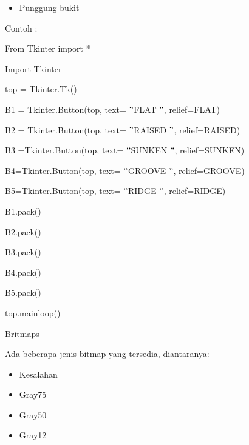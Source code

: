 \documentclass[a4paper,12pt]{report}
\begin{document}
\begin{myEnumerate}
\begin{itemize}
\noindent 
\item Punggung bukit\end{itemize}
 \par
\vspace{12pt}
Contoh : \par
{\fontsize{10pt}{10pt}\selectfont From Tkinter import *} \par
{\fontsize{10pt}{10pt}\selectfont Import Tkinter} \par
\vspace{10pt}
{\fontsize{10pt}{10pt}\selectfont top = Tkinter.Tk()} \par
{\fontsize{10pt}{10pt}\selectfont B1 = Tkinter.Button(top, text= $ " $FLAT $ " $, relief=FLAT)} \par
{\fontsize{10pt}{10pt}\selectfont B2 = Tkinter.Button(top, text= $ " $RAISED $ " $, relief=RAISED)} \par
{\fontsize{10pt}{10pt}\selectfont B3 =Tkinter.Button(top, text= $ " $SUNKEN $ " $, relief=SUNKEN)} \par
{\fontsize{10pt}{10pt}\selectfont B4=Tkinter.Button(top, text= $ " $GROOVE $ " $, relief=GROOVE)} \par
{\fontsize{10pt}{10pt}\selectfont B5=Tkinter.Button(top, text= $ " $RIDGE $ " $, relief=RIDGE)} \par
\vspace{10pt}
{\fontsize{10pt}{10pt}\selectfont B1.pack()} \par
{\fontsize{10pt}{10pt}\selectfont B2.pack()} \par
{\fontsize{10pt}{10pt}\selectfont B3.pack()} \par
{\fontsize{10pt}{10pt}\selectfont B4.pack()} \par
{\fontsize{10pt}{10pt}\selectfont B5.pack()} \par
{\fontsize{10pt}{10pt}\selectfont top.mainloop()} \par
\noindent 
\item Britmaps \par
\noindent 
Ada beberapa jenis bitmap yang tersedia, diantaranya: \par
\noindent 
\begin{itemize}
\item Kesalahan \par
\noindent 
\item Gray75 \par
\noindent 
\item Gray50 \par
\noindent 
\item Gray12 \par

\end{itemize}
\end{myEnumerate}
\end{document}
